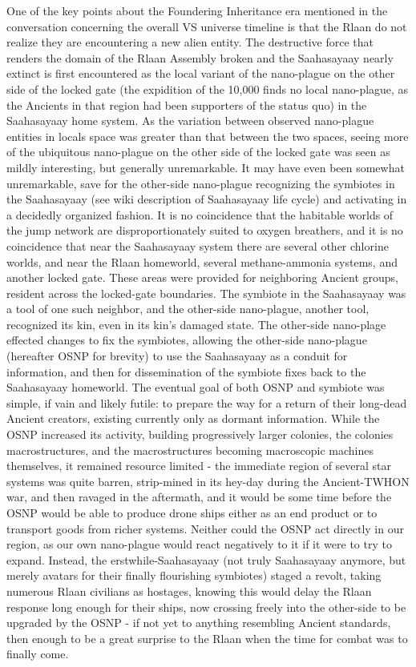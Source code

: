 One of the key points about the Foundering Inheritance era mentioned in the conversation concerning the overall VS universe timeline is that the Rlaan do not realize they are encountering a new alien entity. The destructive force that renders the domain of the Rlaan Assembly broken and the Saahasayaay nearly extinct is first encountered as the local variant of the nano-plague on the other side of the locked gate (the expidition of the 10,000 finds no local nano-plague, as the Ancients in that region had been supporters of the status quo) in the Saahasayaay home system. As the variation between observed nano-plague entities in locals space was greater than that between the two spaces, seeing more of the ubiquitous nano-plague on the other side of the locked gate was seen as mildly interesting, but generally unremarkable. It may have even been somewhat unremarkable, save for the other-side nano-plague recognizing the symbiotes in the Saahasayaay (see wiki description of Saahasayaay life cycle) and activating in a decidedly organized fashion. It is no coincidence that the habitable worlds of the jump network are disproportionately suited to oxygen breathers, and it is no coincidence that near the Saahasayaay system there are several other chlorine worlds, and near the Rlaan homeworld, several methane-ammonia systems, and another locked gate. These areas were provided for neighboring Ancient groups, resident across the locked-gate boundaries. The symbiote in the Saahasayaay was a tool of one such neighbor, and the other-side nano-plague, another tool, recognized its kin, even in its kin's damaged state. The other-side nano-plage effected changes to fix the symbiotes, allowing the other-side nano-plague (hereafter OSNP for brevity) to use the Saahasayaay as a conduit for information, and then for dissemination of the symbiote fixes back to the Saahasayaay homeworld. The eventual goal of both OSNP and symbiote was simple, if vain and likely futile: to prepare the way for a return of their long-dead Ancient creators, existing currently only as dormant information. While the OSNP increased its activity, building progressively larger colonies, the colonies macrostructures, and the macrostructures becoming macroscopic machines themselves, it remained resource limited - the immediate region of several star systems was quite barren, strip-mined in its hey-day during the Ancient-TWHON war, and then ravaged in the aftermath, and it would be some time before the OSNP would be able to produce drone ships either as an end product or to transport goods from richer systems. Neither could the OSNP act directly in our region, as our own nano-plague would react negatively to it if it were to try to expand. Instead, the erstwhile-Saahasayaay (not truly Saahasayaay anymore, but merely avatars for their finally flourishing symbiotes) staged a revolt, taking numerous Rlaan civilians as hostages, knowing this would delay the Rlaan response long enough for their ships, now crossing freely into the other-side to be upgraded by the OSNP - if not yet to anything resembling Ancient standards, then enough to be a great surprise to the Rlaan when the time for combat was to finally come. 

